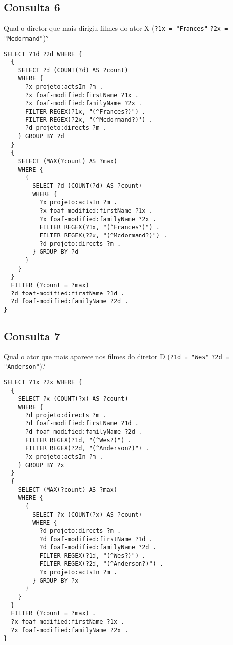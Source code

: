 \documentclass{article}
\newcommand{\code}[1]{\lstinline[mathescape=true]{#1}}
\begin{document}
\subsection{Consulta 6}
Qual o diretor que mais dirigiu filmes do ator X (\code{?1x = "Frances"} \code{?2x = "Mcdormand"})?
\begin{lstlisting}[basicstyle=\ttfamily,frame=single]
SELECT ?1d ?2d WHERE {
  {
    SELECT ?d (COUNT(?d) AS ?count)
    WHERE {
      ?x projeto:actsIn ?m .
      ?x foaf-modified:firstName ?1x .
      ?x foaf-modified:familyName ?2x .
      FILTER REGEX(?1x, "(^Frances?)") .
      FILTER REGEX(?2x, "(^Mcdormand?)") .
      ?d projeto:directs ?m .
    } GROUP BY ?d
  }
  {
    SELECT (MAX(?count) AS ?max)
    WHERE {
      {
        SELECT ?d (COUNT(?d) AS ?count)
        WHERE {
          ?x projeto:actsIn ?m .
          ?x foaf-modified:firstName ?1x .
          ?x foaf-modified:familyName ?2x .
          FILTER REGEX(?1x, "(^Frances?)") .
          FILTER REGEX(?2x, "(^Mcdormand?)") .
          ?d projeto:directs ?m .
        } GROUP BY ?d
      }
    } 
  }
  FILTER (?count = ?max)
  ?d foaf-modified:firstName ?1d .
  ?d foaf-modified:familyName ?2d .
}
\end{lstlisting}
\subsection{Consulta 7}
Qual o ator que mais aparece nos filmes do diretor D (\code{?1d = "Wes"} \code{?2d = "Anderson"})?
\begin{lstlisting}[basicstyle=\ttfamily,frame=single]
SELECT ?1x ?2x WHERE {
  {
    SELECT ?x (COUNT(?x) AS ?count)
    WHERE {
      ?d projeto:directs ?m .
      ?d foaf-modified:firstName ?1d .
      ?d foaf-modified:familyName ?2d .
      FILTER REGEX(?1d, "(^Wes?)") .
      FILTER REGEX(?2d, "(^Anderson?)") .
      ?x projeto:actsIn ?m .
    } GROUP BY ?x
  }
  {
    SELECT (MAX(?count) AS ?max)
    WHERE {
      {
        SELECT ?x (COUNT(?x) AS ?count)
        WHERE {
          ?d projeto:directs ?m .
          ?d foaf-modified:firstName ?1d .
          ?d foaf-modified:familyName ?2d .
          FILTER REGEX(?1d, "(^Wes?)") .
          FILTER REGEX(?2d, "(^Anderson?)") .
          ?x projeto:actsIn ?m .
        } GROUP BY ?x
      }
    }
  }
  FILTER (?count = ?max) .
  ?x foaf-modified:firstName ?1x .
  ?x foaf-modified:familyName ?2x .
}
\end{lstlisting}
\end{document}
